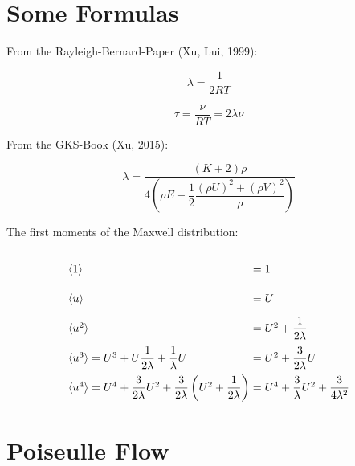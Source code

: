 \documentclass[
	pdftex,             %
	12pt,				%
	a4paper,		   	%
	english,				%
	oneside,			%
]{article}
\newcommand{\mom}[1]{\langle #1 \rangle}
\begin{document}
\clearpage

\section{Some Formulas}

From the Rayleigh-Bernard-Paper (Xu, Lui, 1999):

\begin{equation}
\lambda = \frac{1}{2RT}
\end{equation}

\begin{equation}
\tau = \frac{\nu}{RT} = 2\lambda\nu
\end{equation}

From the GKS-Book (Xu, 2015):

\begin{equation}
\lambda =\frac{(K+2)\rho}
{4\left( \rho E - \dfrac{1}{2} \dfrac{(\rho U)^2 + (\rho V)^2}{\rho}  \right)}
\end{equation}

The first moments of the Maxwell distribution:

\begin{equation}
\arraycolsep=1.4pt\def\arraystretch{2.2}
\begin{array}{lcl}
\mom{1} &=& 1 \\
\mom{u} &=& U \\
\mom{u^2} &=& U^2 + \dfrac{1}{2\lambda} \\
\mom{u^3} = U^3 + U\dfrac{1}{2\lambda} + \dfrac{1}{\lambda} U &=& U^2 + \dfrac{3}{2\lambda} U \\
\mom{u^4} = U^4 + \dfrac{3}{2\lambda} U^2 + \dfrac{3}{2\lambda} \left(U^2 + \dfrac{1}{2\lambda} \right)
		  &=& U^4 + \dfrac{3}{\lambda} U^2 + \dfrac{3}{4\lambda^2}
\end{array}
\end{equation}

\clearpage

\section{Poiseulle Flow}
\end{document}
